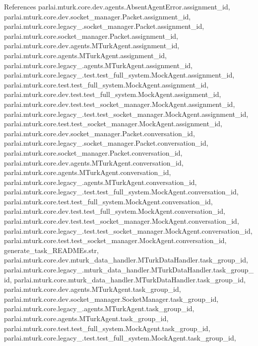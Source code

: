 References parlai.\+mturk.\+core.\+dev.\+agents.\+Absent\+Agent\+Error.\+assignment\+\_\+id, parlai.\+mturk.\+core.\+dev.\+socket\+\_\+manager.\+Packet.\+assignment\+\_\+id, parlai.\+mturk.\+core.\+legacy\+\_.\+socket\+\_\+manager.\+Packet.\+assignment\+\_\+id, parlai.\+mturk.\+core.\+socket\+\_\+manager.\+Packet.\+assignment\+\_\+id, parlai.\+mturk.\+core.\+dev.\+agents.\+M\+Turk\+Agent.\+assignment\+\_\+id, parlai.\+mturk.\+core.\+agents.\+M\+Turk\+Agent.\+assignment\+\_\+id, parlai.\+mturk.\+core.\+legacy\+\_.\+agents.\+M\+Turk\+Agent.\+assignment\+\_\+id, parlai.\+mturk.\+core.\+legacy\+\_.\+test.\+test\+\_\+full\+\_\+system.\+Mock\+Agent.\+assignment\+\_\+id, parlai.\+mturk.\+core.\+test.\+test\+\_\+full\+\_\+system.\+Mock\+Agent.\+assignment\+\_\+id, parlai.\+mturk.\+core.\+dev.\+test.\+test\+\_\+full\+\_\+system.\+Mock\+Agent.\+assignment\+\_\+id, parlai.\+mturk.\+core.\+dev.\+test.\+test\+\_\+socket\+\_\+manager.\+Mock\+Agent.\+assignment\+\_\+id, parlai.\+mturk.\+core.\+legacy\+\_.\+test.\+test\+\_\+socket\+\_\+manager.\+Mock\+Agent.\+assignment\+\_\+id, parlai.\+mturk.\+core.\+test.\+test\+\_\+socket\+\_\+manager.\+Mock\+Agent.\+assignment\+\_\+id, parlai.\+mturk.\+core.\+dev.\+socket\+\_\+manager.\+Packet.\+conversation\+\_\+id, parlai.\+mturk.\+core.\+legacy\+\_.\+socket\+\_\+manager.\+Packet.\+conversation\+\_\+id, parlai.\+mturk.\+core.\+socket\+\_\+manager.\+Packet.\+conversation\+\_\+id, parlai.\+mturk.\+core.\+dev.\+agents.\+M\+Turk\+Agent.\+conversation\+\_\+id, parlai.\+mturk.\+core.\+agents.\+M\+Turk\+Agent.\+conversation\+\_\+id, parlai.\+mturk.\+core.\+legacy\+\_.\+agents.\+M\+Turk\+Agent.\+conversation\+\_\+id, parlai.\+mturk.\+core.\+legacy\+\_.\+test.\+test\+\_\+full\+\_\+system.\+Mock\+Agent.\+conversation\+\_\+id, parlai.\+mturk.\+core.\+test.\+test\+\_\+full\+\_\+system.\+Mock\+Agent.\+conversation\+\_\+id, parlai.\+mturk.\+core.\+dev.\+test.\+test\+\_\+full\+\_\+system.\+Mock\+Agent.\+conversation\+\_\+id, parlai.\+mturk.\+core.\+dev.\+test.\+test\+\_\+socket\+\_\+manager.\+Mock\+Agent.\+conversation\+\_\+id, parlai.\+mturk.\+core.\+legacy\+\_.\+test.\+test\+\_\+socket\+\_\+manager.\+Mock\+Agent.\+conversation\+\_\+id, parlai.\+mturk.\+core.\+test.\+test\+\_\+socket\+\_\+manager.\+Mock\+Agent.\+conversation\+\_\+id, generate\+\_\+task\+\_\+\+R\+E\+A\+D\+M\+Es.\+str, parlai.\+mturk.\+core.\+dev.\+mturk\+\_\+data\+\_\+handler.\+M\+Turk\+Data\+Handler.\+task\+\_\+group\+\_\+id, parlai.\+mturk.\+core.\+legacy\+\_.\+mturk\+\_\+data\+\_\+handler.\+M\+Turk\+Data\+Handler.\+task\+\_\+group\+\_\+id, parlai.\+mturk.\+core.\+mturk\+\_\+data\+\_\+handler.\+M\+Turk\+Data\+Handler.\+task\+\_\+group\+\_\+id, parlai.\+mturk.\+core.\+dev.\+agents.\+M\+Turk\+Agent.\+task\+\_\+group\+\_\+id, parlai.\+mturk.\+core.\+dev.\+socket\+\_\+manager.\+Socket\+Manager.\+task\+\_\+group\+\_\+id, parlai.\+mturk.\+core.\+legacy\+\_.\+agents.\+M\+Turk\+Agent.\+task\+\_\+group\+\_\+id, parlai.\+mturk.\+core.\+agents.\+M\+Turk\+Agent.\+task\+\_\+group\+\_\+id, parlai.\+mturk.\+core.\+test.\+test\+\_\+full\+\_\+system.\+Mock\+Agent.\+task\+\_\+group\+\_\+id, parlai.\+mturk.\+core.\+legacy\+\_.\+test.\+test\+\_\+full\+\_\+system.\+Mock\+Agent.\+task\+\_\+group\+\_\+id, 